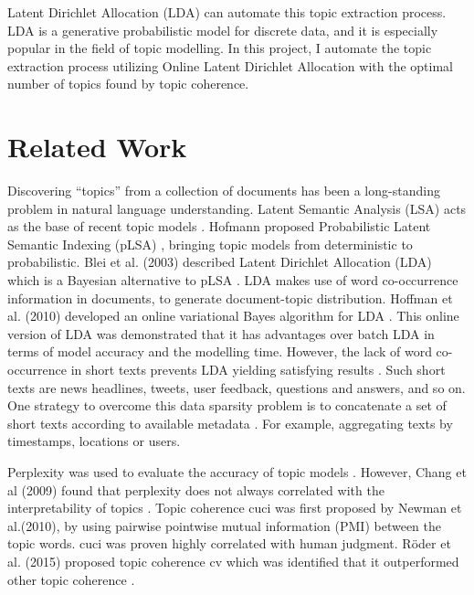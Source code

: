 \documentclass{article} %
\begin{document}
    Latent Dirichlet Allocation (LDA) can automate this topic extraction process. LDA is a generative probabilistic model for discrete data, and it is especially popular in the field of topic modelling.
    In this project, I automate the topic extraction process utilizing Online Latent Dirichlet Allocation with the optimal number of topics found by topic coherence.

    \section{Related Work}
    \label{gen_inst}

    Discovering “topics” from a collection of documents has been a long-standing problem
    in natural language understanding. Latent Semantic Analysis (LSA) acts as the base of
    recent topic models \cite{deerwester_indexing_1990}. Hofmann proposed Probabilistic Latent Semantic Indexing (pLSA) \cite{hofmann_probabilistic_2017}, bringing topic models from deterministic to probabilistic. Blei et al. (2003) described Latent Dirichlet Allocation (LDA) which is a Bayesian alternative to pLSA \cite{blei_latent_2003}. LDA makes use of word co-occurrence information in documents, to generate document-topic distribution. Hoffman et al. (2010) developed an online variational Bayes algorithm for LDA \cite{hoffman_online_2010}. This online version of LDA was demonstrated that it has advantages over batch LDA in terms of model accuracy and the modelling time.
    However, the lack of word co-occurrence in short texts prevents LDA yielding satisfying
    results \cite{li_topic_2016}. Such short texts are news headlines, tweets, user feedback, questions and answers, and so on. One strategy to overcome this data sparsity problem is to concatenate a set of short texts according to available metadata \cite{weng_twitterrank:_2010, hong_empirical_2010, mehrotra_improving_2013}. For example, aggregating texts by timestamps, locations or users.

    Perplexity was used to evaluate the accuracy of topic models \cite{wallach_evaluation_2009}. However, Chang et al (2009) found that perplexity does not always correlated with the interpretability of topics \cite{chang_reading_2009}. Topic coherence c\textunderscore{}uci was first proposed by Newman et al.(2010)\cite{newman_automatic_nodate}, by using pairwise pointwise mutual information (PMI) between the topic words. c\textunderscore{}uci was proven highly correlated with human judgment. Röder et al. (2015) proposed topic coherence c\textunderscore{}v which was identified that it outperformed other topic coherence \cite{roder_exploring_2015}.
\end{document}
